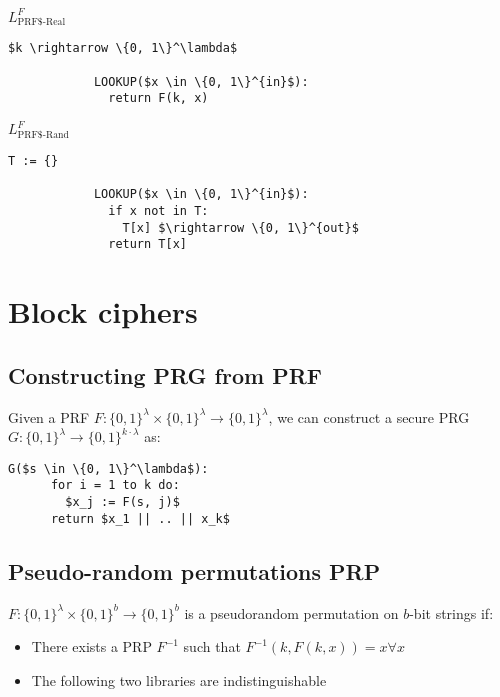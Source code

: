 \documentclass[a4paper]{scrreprt}
\begin{document}
\begin{tcbraster}[raster columns=2,raster equal height,nobeforeafter,raster column skip=2cm]
	\begin{library}{$L^F_{\text{PRF\$-Real}}$}
		\begin{lstlisting}[mathescape=true,autogobble=true]
			$k \rightarrow \{0, 1\}^\lambda$

			LOOKUP($x \in \{0, 1\}^{in}$):
			  return F(k, x)
		\end{lstlisting}
	\end{library}
	\begin{library}{$L^F_{\text{PRF\$-Rand}}$}
		\begin{lstlisting}[mathescape=true,autogobble=true]
			T := {}

			LOOKUP($x \in \{0, 1\}^{in}$):
			  if x not in T:
			    T[x] $\rightarrow \{0, 1\}^{out}$
			  return T[x]
		\end{lstlisting}
	\end{library}
\end{tcbraster}

\chapter{Block ciphers}

\section{Constructing PRG from PRF}

Given a PRF $F: \{0, 1\}^\lambda \times \{0, 1\}^\lambda \rightarrow \{0,
1\}^\lambda$, we can construct a secure PRG $G: \{0, 1\}^\lambda \rightarrow
\{0, 1\}^{k \cdot \lambda}$ as:

\begin{lstlisting}[mathescape=true,autogobble=true]
	G($s \in \{0, 1\}^\lambda$):
	  for i = 1 to k do:
	    $x_j := F(s, j)$
	  return $x_1 || .. || x_k$
\end{lstlisting}

\section{Pseudo-random permutations PRP}

$F: \{0, 1\}^\lambda \times \{0, 1\}^b \rightarrow \{0, 1\}^b$ is a
pseudorandom permutation on $b$-bit strings if:
\begin{itemize}
	\item There exists a PRP $F^{-1}$ such that $F^{-1}(k, F(k, x)) = x \forall x$
	\item The following two libraries are indistinguishable
\end{itemize}
\end{document}
